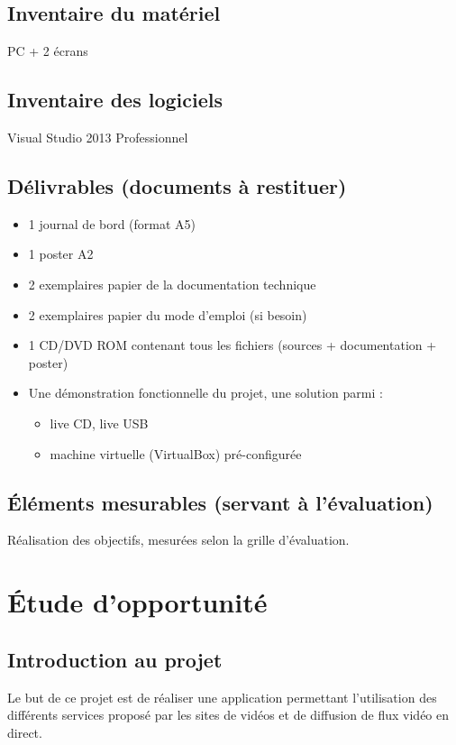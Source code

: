 \documentclass[11pt]{report} %
\begin{document}
	\section{Inventaire du matériel}
	PC + 2 écrans

	\section{Inventaire des logiciels}
	Visual Studio 2013 Professionnel
	
	\section{Délivrables (documents à restituer)}
	\begin{itemize}
		\item 1 journal de bord (format A5)
		\item 1 poster A2
		\item 2 exemplaires papier de la documentation technique
		\item 2 exemplaires papier du mode d'emploi (si besoin)
		\item 1 CD/DVD ROM contenant tous les fichiers (sources + documentation + poster)
		\item Une démonstration fonctionnelle du projet, une solution parmi :
		\begin{itemize}
			\item live CD, live USB
			\item machine virtuelle (VirtualBox) pré-configurée
		\end{itemize}
	\end{itemize}

	\section{Éléments mesurables (servant à l'évaluation)}
	Réalisation des objectifs, mesurées selon la grille d'évaluation.

\chapter{Étude d'opportunité}
	\section{Introduction au projet}
	Le but de ce projet est de réaliser une application permettant l'utilisation des différents services proposé par les sites de vidéos et de diffusion de flux vidéo en direct.
\end{document}
